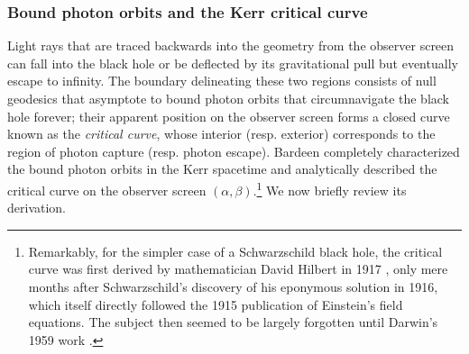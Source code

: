 \documentclass[graybox,envcountchap]{svmult}
\begin{document}
\subsubsection*{Bound photon orbits and the Kerr critical curve}

Light rays that are traced backwards into the geometry from the observer screen can fall into the black hole or be deflected by its gravitational pull but eventually escape to infinity.
The boundary delineating these two regions consists of null geodesics that asymptote to bound photon orbits that circumnavigate the black hole forever; their apparent position on the observer screen forms a closed curve known as the \emph{critical curve}, whose interior (resp. exterior) corresponds to the region of photon capture (resp. photon escape).
Bardeen \cite{Bardeen1973} completely characterized the bound photon orbits in the Kerr spacetime and analytically described the critical curve on the observer screen $(\alpha,\beta)$.\footnote{Remarkably, for the simpler case of a Schwarzschild black hole, the critical curve was first derived by mathematician David Hilbert in 1917 \cite{Hilbert1917}, only mere months after Schwarzschild's discovery of his eponymous solution in 1916, which itself directly followed the 1915 publication of Einstein's field equations.
The subject then seemed to be largely forgotten until Darwin's 1959 work \cite{Darwin1959}.}
We now briefly review its derivation.
\end{document}
